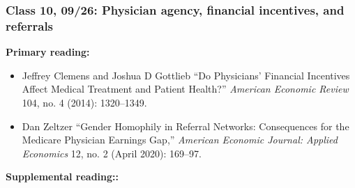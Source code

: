 \documentclass[11pt,]{article}
\providecommand{\tightlist}{%
  \setlength{\itemsep}{0pt}\setlength{\parskip}{0pt}}
\begin{document}
\hypertarget{class-10-0926-physician-agency-financial-incentives-and-referrals}{%
\subsubsection{Class 10, 09/26: Physician agency, financial incentives,
and
referrals}\label{class-10-0926-physician-agency-financial-incentives-and-referrals}}

\textbf{Primary reading:}

\begin{itemize}
\tightlist
\item
  Jeffrey Clemens and Joshua D Gottlieb {``Do {Physicians}' {Financial}
  {Incentives} {Affect} {Medical} {Treatment} and {Patient} {Health}?''}
  \emph{American Economic Review} 104, no. 4 (2014): 1320--1349.
\item
  Dan Zeltzer {``Gender {Homophily} in {Referral} {Networks}:
  {Consequences} for the {Medicare} {Physician} {Earnings} {Gap},''}
  \emph{American Economic Journal: Applied Economics} 12, no. 2 (April
  2020): 169--97.
\end{itemize}

\textbf{Supplemental reading::}
\end{document}
